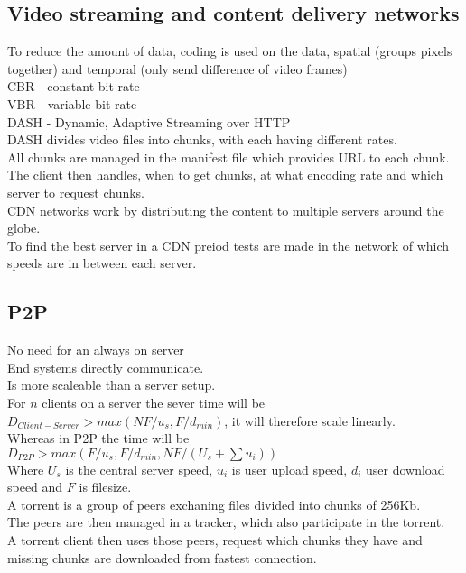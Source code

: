 \documentclass[12pt, a4paper]{article}
\begin{document}
		\subsection{Video streaming and content delivery networks}
			To reduce the amount of data, coding is used on the data, spatial (groups pixels together) and temporal (only send difference of video frames)\\
			CBR - constant bit rate\\
			VBR - variable bit rate\\
			DASH - Dynamic, Adaptive Streaming over HTTP\\
			DASH divides video files into chunks, with each having different rates.\\
			All chunks are managed in the manifest file which provides URL to each chunk.\\
			The client then handles, when to get chunks, at what encoding rate and which server to request chunks.\\
			CDN networks work by distributing the content to multiple servers around the globe.\\
			To find the best server in a CDN preiod tests are made in the network of which speeds are in between each server.\\
		\subsection{P2P}
			No need for an always on server\\
			End systems directly communicate.\\
			Is more scaleable than a server setup.\\
			For $n$ clients on a server the sever time will be $D_{Client-Server}>max(NF/u_s,F/d_{min})$, it will therefore scale linearly.\\
			Whereas in P2P the time will be $D_{P2P}>max(F/u_s,F/d_{min},NF/(U_s+\sum u_i))$\\
			Where $U_s$ is the central server speed, $u_i$ is user upload speed, $d_i$ user download speed and $F$ is filesize.\\
			A torrent is a group of peers exchaning files divided into chunks of 256Kb.\\
			The peers are then managed in a tracker, which also participate in the torrent.\\
			A torrent client then uses those peers, request which chunks they have and missing chunks are downloaded from fastest connection.\\
			
\end{document}
